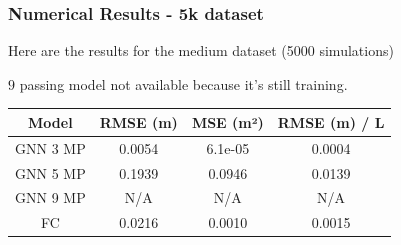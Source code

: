 \documentclass{beamer}
\begin{document}
\begin{frame}
    \frametitle{Numerical Results - 5k dataset}
    Here are the results for the medium dataset (5000 simulations)

    \(9\) passing model not available because it's still training.
    \begin{table}
        \centering
        \begin{tabular}{|c|c|c|c|}
            \hline
            Model & RMSE (m) & MSE (m²) & RMSE (m) / L \\
            \hline
            GNN 3 MP & 0.0054 & 6.1e-05 & 0.0004 \\
            \hline
            GNN 5 MP & 0.1939 & 0.0946 & 0.0139 \\
            \hline
            GNN 9 MP & N/A & N/A & N/A \\
            \hline
            FC & 0.0216 & 0.0010 & 0.0015 \\
            \hline
        \end{tabular}
    \end{table}
\end{frame}
\end{document}
